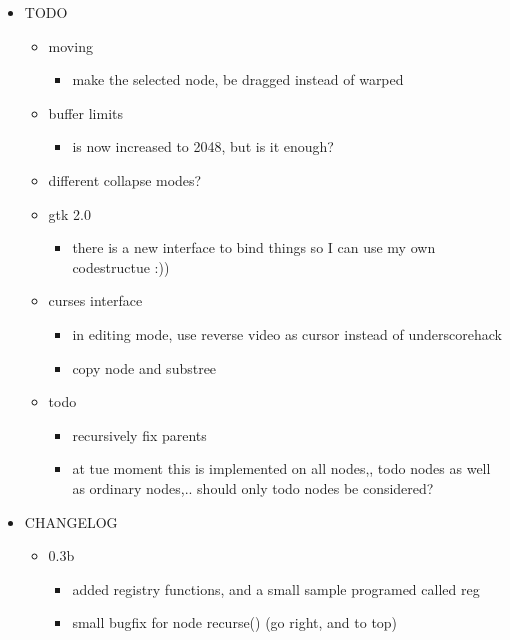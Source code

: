 \documentclass{article}
\begin{document}
\begin{itemize}
	\item TODO
	  \begin{itemize}
		\item moving
		  \begin{itemize}
			\item make the selected node, be dragged instead of warped
		  \end{itemize}

		\item buffer limits
		  \begin{itemize}
			\item is now increased to 2048, but is it enough?
		  \end{itemize}

		\item different collapse modes?
		\item gtk 2.0
		  \begin{itemize}
			\item there is a new interface to bind things so I can use my own codestructue :))
		  \end{itemize}

		\item curses interface
		  \begin{itemize}
			\item in editing mode, use reverse video as cursor instead of underscorehack
			\item copy node and substree
		  \end{itemize}

		\item todo
		  \begin{itemize}
			\item recursively fix parents
			\item at tue moment this is implemented on all nodes,, todo nodes as well as ordinary nodes,.. should only todo nodes be considered?
		  \end{itemize}

	  \end{itemize}

	\item CHANGELOG
	  \begin{itemize}
		\item 0.3b
		  \begin{itemize}
			\item added registry functions, and a small sample programed called reg
			\item small bugfix for node recurse()  (go right, and to top)
		  \end{itemize}


\end{itemize}
\end{itemize}
\end{document}
